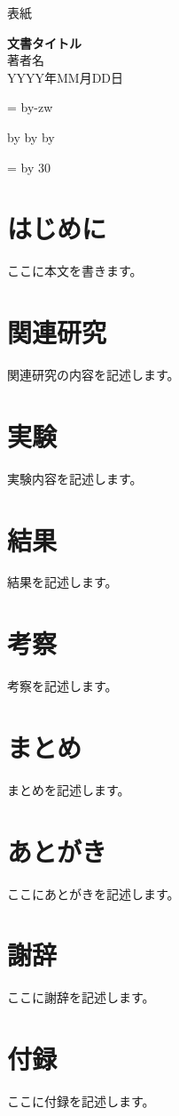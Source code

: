 \documentclass[a4paper,10.5pt]{jsarticle}
\makeatletter
\def\mojiparline#1{
    \newcounter{mpl}
    \setcounter{mpl}{#1}
    \@tempdima=\linewidth
    \advance\@tempdima by-\value{mpl}zw
    \addtocounter{mpl}{-1}
    \divide\@tempdima by \value{mpl}
    \advance\kanjiskip by\@tempdima
    \advance\parindent by\@tempdima
}
\def\linesparpage#1{
    \baselineskip=\textheight
    \divide\baselineskip by #1
}
\makeatother
\begin{document}
表紙
\begin{titlepage}
    \centering
    \vspace*{\fill}
    {\Huge\bfseries 文書タイトル} \\[2cm]
    {\large 著者名} \\[0.5cm]
    \vspace*{\fill}
    {\large YYYY年MM月DD日} %
\end{titlepage}

\tableofcontents
\newpage
{} %
\mojiparline{40}
\linesparpage{30}

\section{はじめに}
ここに本文を書きます。

\section{関連研究}
関連研究の内容を記述します。

\section{実験}
実験内容を記述します。

\section{結果}
結果を記述します。

\section{考察}
考察を記述します。

\section{まとめ}
まとめを記述します。

\newpage




\newpage
\section*{あとがき}
ここにあとがきを記述します。

\newpage
\section*{謝辞}
ここに謝辞を記述します。

\newpage
\section*{付録}
ここに付録を記述します。
\end{document}
